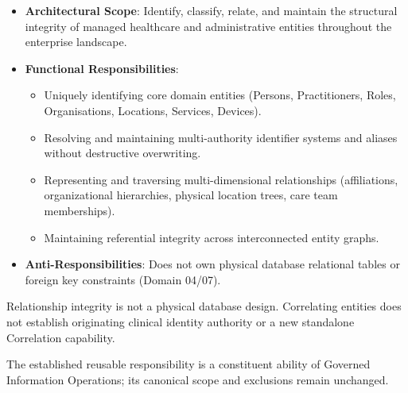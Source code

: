 
\begin{itemize}

\item
\textbf{Architectural Scope}: Identify, classify, relate, and maintain the structural integrity of managed healthcare and administrative entities throughout the enterprise landscape.



\item
\textbf{Functional Responsibilities}:


\begin{itemize}

\item
Uniquely identifying core domain entities (Persons, Practitioners, Roles, Organisations, Locations, Services, Devices).



\item
Resolving and maintaining multi-authority identifier systems and aliases without destructive overwriting.



\item
Representing and traversing multi-dimensional relationships (affiliations, organizational hierarchies, physical location trees, care team memberships).



\item
Maintaining referential integrity across interconnected entity graphs.



\end{itemize}


\item
\textbf{Anti-Responsibilities}: Does not own physical database relational tables or foreign key constraints (Domain 04/\allowbreak{}07).



\end{itemize}


Relationship integrity is not a physical database design. Correlating entities does not establish originating clinical identity authority or a new standalone Correlation capability.



The established reusable responsibility is a constituent ability of Governed Information Operations; its canonical scope and exclusions remain unchanged.


